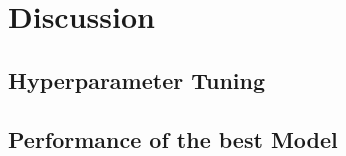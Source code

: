


\section{Discussion}
\label{discussion}

\subsection{Hyperparameter Tuning}%



\subsection{Performance of the best Model}%



